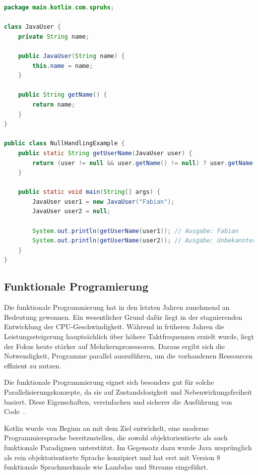 \documentclass[11pt]{article}
\begin{document}
    \begin{lstlisting}[language=Java, caption={NullHandlingExample.java}, label={lst:java-user-null-safety}]
    package main.kotlin.com.spruhs;

class JavaUser {
    private String name;

    public JavaUser(String name) {
        this.name = name;
    }

    public String getName() {
        return name;
    }
}

public class NullHandlingExample {
    public static String getUserName(JavaUser user) {
        return (user != null && user.getName() != null) ? user.getName() : "Unbekannter Benutzer";
    }

    public static void main(String[] args) {
        JavaUser user1 = new JavaUser("Fabian");
        JavaUser user2 = null;

        System.out.println(getUserName(user1)); // Ausgabe: Fabian
        System.out.println(getUserName(user2)); // Ausgabe: Unbekannter Benutzer
    }
}
    \end{lstlisting}

    \subsection{Funktionale Programierung}

    Die funktionale Programmierung hat in den letzten Jahren zunehmend an Bedeutung gewonnen.
    Ein wesentlicher Grund dafür liegt in der stagnierenden Entwicklung der CPU-Geschwindigkeit.
    Während in früheren Jahren die Leistungssteigerung hauptsächlich über höhere Taktfrequenzen erzielt wurde, liegt der Fokus heute stärker auf Mehrkernprozessoren.
    Daraus ergibt sich die Notwendigkeit, Programme parallel auszuführen, um die vorhandenen Ressourcen effizient zu nutzen.

    Die funktionale Programmierung eignet sich besonders gut für solche Parallelisierungskonzepte, da sie auf Zustandslosigkeit und Nebenwirkungsfreiheit basiert.
    Diese Eigenschaften, vereinfachen und sicherer die Ausführung von Code~\cite[129]{kotlin-patterns}.

    Kotlin wurde von Beginn an mit dem Ziel entwickelt, eine moderne Programmiersprache bereitzustellen, die sowohl objektorientierte als auch funktionale Paradigmen unterstützt.
    Im Gegensatz dazu wurde Java ursprünglich als rein objektorientierte Sprache konzipiert und hat erst mit Version 8 funktionale Sprachmerkmale wie Lambdas und Streams eingeführt.
\end{document}

